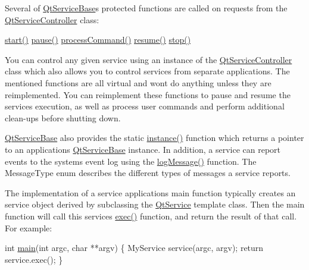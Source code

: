 Several of \mbox{\hyperlink{class_qt_service_base}{Qt\+Service\+Base}}\textquotesingle{}s protected functions are called on requests from the \mbox{\hyperlink{class_qt_service_controller}{Qt\+Service\+Controller}} class\+:

\mbox{\hyperlink{class_qt_service_base_adbc0cd621b41bd3a6a1f62fda432e9e4}{start()}}  \mbox{\hyperlink{class_qt_service_base_a43215a7c5c047d30bcf4f697e6691f89}{pause()}}  \mbox{\hyperlink{class_qt_service_base_a47485f00f6eba0758d2ffc75092295cf}{process\+Command()}}  \mbox{\hyperlink{class_qt_service_base_aaa2e05ef1c36283b6b35348c3972b489}{resume()}}  \mbox{\hyperlink{class_qt_service_base_a8d52c1b8fd06b50bdc0a0c6f9936a68e}{stop()}} 

You can control any given service using an instance of the \mbox{\hyperlink{class_qt_service_controller}{Qt\+Service\+Controller}} class which also allows you to control services from separate applications. The mentioned functions are all virtual and won\textquotesingle{}t do anything unless they are reimplemented. You can reimplement these functions to pause and resume the service\textquotesingle{}s execution, as well as process user commands and perform additional clean-\/ups before shutting down.

\mbox{\hyperlink{class_qt_service_base}{Qt\+Service\+Base}} also provides the static \mbox{\hyperlink{class_qt_service_base_a8f030376e32cc47736bfc1a1e1ecf855}{instance()}} function which returns a pointer to an application\textquotesingle{}s \mbox{\hyperlink{class_qt_service_base}{Qt\+Service\+Base}} instance. In addition, a service can report events to the system\textquotesingle{}s event log using the \mbox{\hyperlink{class_qt_service_base_ac071ce0b30547e17c3b3ca9dcb0108c9}{log\+Message()}} function. The Message\+Type enum describes the different types of messages a service reports.

The implementation of a service application\textquotesingle{}s main function typically creates an service object derived by subclassing the \mbox{\hyperlink{class_qt_service}{Qt\+Service}} template class. Then the main function will call this service\textquotesingle{}s \mbox{\hyperlink{class_qt_service_base_afae2e589de71c1ae3ae8db3dc9ab9c64}{exec()}} function, and return the result of that call. For example\+:


\begin{DoxyCode}
\textcolor{keywordtype}{int} \mbox{\hyperlink{prerequisites_2_qt_web_app_2_demo1_2src_2main_8cpp_a0ddf1224851353fc92bfbff6f499fa97}{main}}(\textcolor{keywordtype}{int} argc, \textcolor{keywordtype}{char} **argv)
\{
    MyService service(argc, argv);
    \textcolor{keywordflow}{return} service.exec();
\}
\end{DoxyCode}


